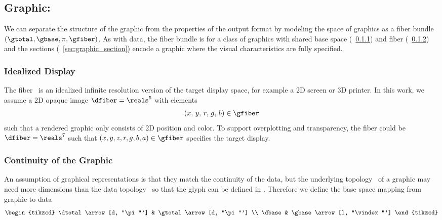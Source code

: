 \documentclass[../main.tex]{subfiles}
\begin{document}
\subsection{Graphic: \gtotal}
\label{sec:graphic}  
We can separate the structure of the graphic from the properties of the output format by modeling the space of graphics as a fiber bundle  $(\gtotal, \gbase, \pi, \gfiber)$. As with data, the fiber bundle is for a class of graphics with shared base space \gbase (~\ref{sec:graphic_fiber}) and fiber \gfiber (~\ref{sec:graphic_base}) and the sections \gsection (~\ref{sec:graphic_section}) encode a graphic where the visual characteristics are fully specified.

\subsubsection{Idealized Display \gfiber}
\label{sec:graphic_fiber}
The fiber \gfiber\ is an idealized infinite resolution version of the target display space, for example a 2D screen or 3D printer. In this work, we assume a 2D opaque image $\dfiber=\reals^5$ with elements 
\begin{equation}
(x,\, y,\, r,\, g,\, b) \in \gfiber
\end{equation}
such that a rendered graphic only consists of 2D position and color. To support overplotting and transparency, the fiber could be $\dfiber=\reals^{7}$ such that $(x, y, z, r, g, b, a) \in \gfiber$ specifies the target display. 


\subsubsection{Continuity of the Graphic \gbase} 
\label{sec:graphic_base}
An assumption of graphical representations is that they match the continuity of the data\cite{tufteVisualDisplayQuantitative2001,friendlyBriefHistoryData2008}, but the underlying topology \gbase\ of a graphic may need more dimensions than the data topology \dbase\ so that the glyph can be defined in \dfiber. Therefore we define the base space mapping from graphic \gbase to data \dbase 
\begin{equation}
    \begin{tikzcd}
        \dtotal \arrow[d, "\pi"'] & \gtotal \arrow[d, "\pi"'] \\
        \dbase                   & \gbase \arrow[l, "\vindex"']
        \end{tikzcd}
\end{equation}
\end{document}
